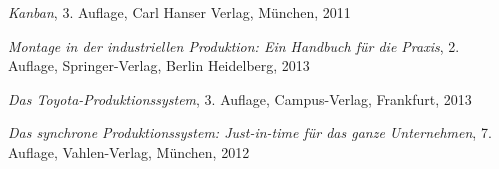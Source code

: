 \newpage
{}
  \begin{thebibliography}{}



%

	 {\sl Kanban}, 3. Auflage, Carl Hanser Verlag, München, 2011

	 {\sl Montage in der industriellen Produktion: Ein Handbuch für die Praxis}, 2. Auflage, Springer-Verlag, Berlin Heidelberg, 2013
	
	 {\sl Das Toyota-Produktionssystem}, 3. Auflage, Campus-Verlag, Frankfurt, 2013

	 {\sl Das synchrone Produktionssystem: Just-in-time für das ganze Unternehmen}, 7. Auflage, Vahlen-Verlag, München, 2012


\end{thebibliography}
